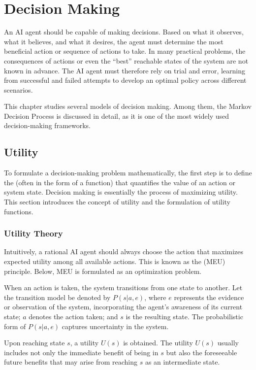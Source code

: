 \chapter{Decision Making}

An AI agent should be capable of making decisions. Based on what it observes, what it believes, and what it desires, the agent must determine the most beneficial action or sequence of actions to take. In many practical problems, the consequences of actions or even the “best” reachable states of the system are not known in advance. The AI agent must therefore rely on trial and error, learning from successful and failed attempts to develop an optimal policy across different scenarios.

This chapter studies several models of decision making. Among them, the Markov Decision Process is discussed in detail, as it is one of the most widely used decision-making frameworks.

\section{Utility}

To formulate a decision-making problem mathematically, the first step is to define the  (often in the form of a function) that quantifies the value of an action or system state. Decision making is essentially the process of maximizing utility. This section introduces the concept of utility and the formulation of utility functions.

\subsection{Utility Theory}

Intuitively, a rational AI agent should always choose the action that maximizes expected utility among all available actions. This is known as the  (MEU) principle. Below, MEU is formulated as an optimization problem.

When an action is taken, the system transitions from one state to another. Let the transition model be denoted by $P(s|a,e)$, where $e$ represents the evidence or observation of the system, incorporating the agent’s awareness of its current state; $a$ denotes the action taken; and $s$ is the resulting state. The probabilistic form of $P(s|a,e)$ captures uncertainty in the system.

Upon reaching state $s$, a utility $U(s)$ is obtained. The utility $U(s)$ usually includes not only the immediate benefit of being in $s$ but also the foreseeable future benefits that may arise from reaching $s$ as an intermediate state.  

